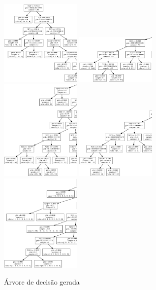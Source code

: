 \documentclass[12pt, a4paper, brazil]{article}
\begin{document}
\begin{landscape}
\begin{figure}[!htb]
  \caption{Árvore de decisão gerada}
    \includegraphics[width=0.35\textwidth]{Iris/arvore.eps}
    \includegraphics[width=0.35\textwidth]{banknote_authentication/arvore.eps}
    \includegraphics[width=0.35\textwidth]{Planning_Relax/arvore.eps}
    \includegraphics[width=0.35\textwidth]{Breast_Cancer/arvore.eps}
    \includegraphics[width=0.35\textwidth]{ecoli/arvore.eps}

\end{figure}
\end{landscape}
\end{document}
